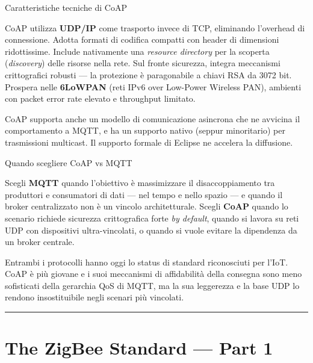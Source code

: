 \documentclass[
  italian,
  openany]{book}
\begin{document}
\begin{calloutnote}{Caratteristiche tecniche di CoAP}

CoAP utilizza \textbf{UDP/IP} come trasporto invece di TCP, eliminando
l'overhead di connessione. Adotta formati di codifica compatti con
header di dimensioni ridottissime. Include nativamente una
\emph{resource directory} per la scoperta (\emph{discovery}) delle
risorse nella rete. Sul fronte sicurezza, integra meccanismi
crittografici robusti --- la protezione è paragonabile a chiavi RSA da
3072 bit. Prospera nelle \textbf{6LoWPAN} (reti IPv6 over Low-Power
Wireless PAN), ambienti con packet error rate elevato e throughput
limitato.

\end{calloutnote}

CoAP supporta anche un modello di comunicazione asincrona che ne
avvicina il comportamento a MQTT, e ha un supporto nativo (seppur
minoritario) per trasmissioni multicast. Il supporto formale di Eclipse
ne accelera la diffusione.

\begin{callouttip}{Quando scegliere CoAP vs MQTT}

Scegli \textbf{MQTT} quando l'obiettivo è massimizzare il
disaccoppiamento tra produttori e consumatori di dati --- nel tempo e
nello spazio --- e quando il broker centralizzato non è un vincolo
architetturale. Scegli \textbf{CoAP} quando lo scenario richiede
sicurezza crittografica forte \emph{by default}, quando si lavora su
reti UDP con dispositivi ultra-vincolati, o quando si vuole evitare la
dipendenza da un broker centrale.

\end{callouttip}

Entrambi i protocolli hanno oggi lo status di standard riconosciuti per
l'IoT. CoAP è più giovane e i suoi meccanismi di affidabilità della
consegna sono meno sofisticati della gerarchia QoS di MQTT, ma la sua
leggerezza e la base UDP lo rendono insostituibile negli scenari più
vincolati.

\begin{center}\rule{0.5\linewidth}{0.5pt}\end{center}

\newpage

\chapter{The ZigBee Standard --- Part
1}\label{the-zigbee-standard-part-1}
\end{document}
